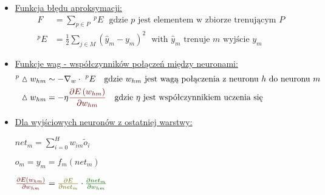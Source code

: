 \documentclass[10pt, a4paper]{article}
\def\layersep{2.5cm}
\begin{document}
\begin{center}
\begin{itemize}


\item[]
\underline{Funkcja błędu aproksymacji:}
\begin{align*}
F &= \sum_{p \in P} \ ^pE \ \ \ \text{gdzie $p$ jest elementem w zbiorze trenującym $P$} \\
^p E &= \frac{1}{2} \sum_{j \in M} \left(\hat{y}_m - y_m \right)^2 \ \ \ \text{with $\hat{y}_m$ trenuje $m$ wyjście $y_m$}
\end{align*}

\item[]
\underline{Funkcje wag - współczynników połączeń między neuronami:}
\begin{align*}
^p \vartriangle w_{hm} &\sim - \nabla_w \cdot \ ^p E \ \ \ \text{gdzie $w_{hm}$ jest wagą połączenia z neuronu $h$ do neuronu $m$} \\
\vartriangle w_{hm} &= - \eta \textcolor{red}{\frac{\partial E \left( w_{hm} \right) }{ \partial w_{hm}} } \ \ \ \text{gdzie $\eta$ jest współczynnikiem uczenia się}
\end{align*}

\item[]
\underline{Dla wyjściowych neuronów z ostatniej warstwy:}

$net_m = \sum_{i=0}^H w_{im} \tilde{o}_i$

$o_m = y_m = f_m(net_m) $

$ \textcolor{red}{\frac{\partial E \left( w_{hm} \right) }{ \partial w_{hm} }} = \textcolor{magenta}{\frac{\partial E }{ \partial net_m }} \cdot \textcolor{green}{\frac{ \partial net_m }{ \partial w_{hm} }}$


\end{itemize}
\end{center}
\end{document}
